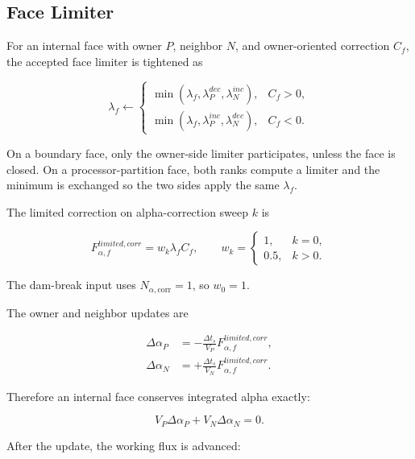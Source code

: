 \documentclass[11pt]{article}
\begin{document}
\subsection{Face Limiter}

For an internal face with owner \(P\), neighbor \(N\), and owner-oriented
correction \(C_f\), the accepted face limiter is tightened as

\begin{equation}
  \lambda_f
  \leftarrow
  \begin{cases}
    \min(\lambda_f,\lambda_P^{dec},\lambda_N^{inc}),
      & C_f>0,\\
    \min(\lambda_f,\lambda_P^{inc},\lambda_N^{dec}),
      & C_f<0.
  \end{cases}
  \label{eq:face-limiter}
\end{equation}

On a boundary face, only the owner-side limiter participates, unless the face is
closed.  On a processor-partition face, both ranks compute a limiter and the
minimum is exchanged so the two sides apply the same \(\lambda_f\).

The limited correction on alpha-correction sweep \(k\) is

\begin{equation}
  F_{\alpha,f}^{limited,corr}
  =
  w_k\lambda_f C_f,
  \qquad
  w_k=
  \begin{cases}
    1, & k=0,\\
    0.5, & k>0.
  \end{cases}
  \label{eq:limited-correction}
\end{equation}

The dam-break input uses \(N_{\alpha,\mathrm{corr}}=1\), so \(w_0=1\).

The owner and neighbor updates are

\begin{align}
  \Delta\alpha_P
  &=
  -\frac{\Delta t_s}{V_P}
  F_{\alpha,f}^{limited,corr},
  \\
  \Delta\alpha_N
  &=
  +\frac{\Delta t_s}{V_N}
  F_{\alpha,f}^{limited,corr}.
\end{align}

Therefore an internal face conserves integrated alpha exactly:

\begin{equation}
  V_P\Delta\alpha_P+V_N\Delta\alpha_N=0.
\end{equation}

After the update, the working flux is advanced:
\end{document}
